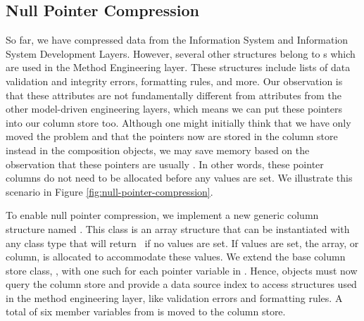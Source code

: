 \subsection{Null Pointer Compression}
\label{compression:null-pointer-compression}


So far, we have compressed data from the Information System and Information System Development Layers. However, several other structures belong to s which are used in the Method Engineering layer. These structures include lists of data validation and integrity errors, formatting rules, and more. Our observation is that these attributes are not fundamentally different from attributes from the other model-driven engineering layers, which means we can put these pointers into our column store too. Although one might initially think that we have only moved the problem and that the pointers now are stored in the column store instead in the composition objects, we may save memory based on the observation that these pointers are usually \nil. In other words, these pointer columns do not need to be allocated before any values are set. We illustrate this scenario in Figure \ref{fig:null-pointer-compression}.

To enable null pointer compression, we implement a new generic column structure named . This class is an array structure that can be instantiated with any class type that will return \nil~if no values are set. If values are set, the array, or column, is allocated to accommodate these values. We extend the base column store class, , with one such  for each pointer variable in . Hence, objects must now query the column store and provide a data source index to access structures used in the method engineering layer, like validation errors and formatting rules. A total of six member variables from  is moved to the column store.

